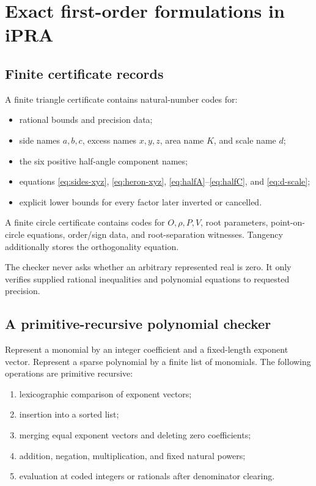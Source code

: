 \documentclass[11pt,letterpaper]{article}
\theoremstyle{definition}
\theoremstyle{remark}
\begin{document}
\section{Exact first-order formulations in iPRA}
\label{sec:ipra}

\subsection{Finite certificate records}

A finite triangle certificate contains natural-number codes for:
\begin{itemize}
\item rational bounds and precision data;
\item side names \(a,b,c\), excess names \(x,y,z\), area name \(K\), and scale
  name \(d\);
\item the six positive half-angle component names;
\item equations \eqref{eq:sides-xyz}, \eqref{eq:heron-xyz},
  \eqref{eq:halfA}--\eqref{eq:halfC}, and \eqref{eq:d-scale};
\item explicit lower bounds for every factor later inverted or cancelled.
\end{itemize}
A finite circle certificate contains codes for \(O,\rho,P,V\), root parameters,
point-on-circle equations, order/sign data, and root-separation witnesses.
Tangency additionally stores the orthogonality equation.

The checker never asks whether an arbitrary represented real is zero.  It only
verifies supplied rational inequalities and polynomial equations to requested
precision.

\subsection{A primitive-recursive polynomial checker}

Represent a monomial by an integer coefficient and a fixed-length exponent
vector.  Represent a sparse polynomial by a finite list of monomials.  The
following operations are primitive recursive:
\begin{enumerate}
\item lexicographic comparison of exponent vectors;
\item insertion into a sorted list;
\item merging equal exponent vectors and deleting zero coefficients;
\item addition, negation, multiplication, and fixed natural powers;
\item evaluation at coded integers or rationals after denominator clearing.
\end{enumerate}
\end{document}
